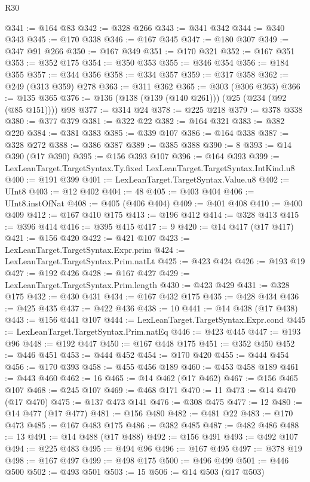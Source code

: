 \begin{lexlean}{R30}
\begin{coremodule}
@341 := @164 @83
@342 := @328 @266
@343 := @341 @342
@344 := @340 @343
@345 := @170 @338
@346 := @167 @345
@347 := @180 @307
@349 := @347 @91 @266
@350 := @167 @349
@351 := @170 @321
@352 := @167 @351
@353 := @352 @175
@354 := @350 @353
@355 := @346 @354
@356 := @184 @355
@357 := @344 @356
@358 := @334 @357
@359 := @317 @358
@362 := @249 (@313 @359) @278
@363 := @311 @362
@365 := @303 (@306 @363)
@366 := @135 @365
@376 := @136 (@138 (@139 (@140 @261))) (@25 (@234 (@92 (@85 @151)))) @98
@377 := @314 @24
@378 := @225 @218
@379 := @378 @338
@380 := @377 @379
@381 := @322 @22
@382 := @164 @321
@383 := @382 @220
@384 := @381 @383
@385 := @339 @107
@386 := @164 @338
@387 := @328 @272
@388 := @386 @387
@389 := @385 @388
@390 := 8
@393 := @14 @390 (@17 @390)
@395 := @156 @393 @107
@396 := @164 @393
@399 := LexLeanTarget.TargetSyntax.Ty.fixed LexLeanTarget.TargetSyntax.IntKind.u8
@400 := @191 @399
@401 := LexLeanTarget.TargetSyntax.Value.u8
@402 := UInt8
@403 := @12 @402
@404 := 48
@405 := @403 @404
@406 := UInt8.instOfNat
@408 := @405 (@406 @404)
@409 := @401 @408
@410 := @400 @409
@412 := @167 @410 @175
@413 := @196 @412
@414 := @328 @413
@415 := @396 @414
@416 := @395 @415
@417 := 9
@420 := @14 @417 (@17 @417)
@421 := @156 @420
@422 := @421 @107
@423 := LexLeanTarget.TargetSyntax.Expr.prim
@424 := LexLeanTarget.TargetSyntax.Prim.natLt
@425 := @423 @424
@426 := @193 @19
@427 := @192 @426
@428 := @167 @427
@429 := LexLeanTarget.TargetSyntax.Prim.length
@430 := @423 @429
@431 := @328 @175
@432 := @430 @431
@434 := @167 @432 @175
@435 := @428 @434
@436 := @425 @435
@437 := @422 @436
@438 := 10
@441 := @14 @438 (@17 @438)
@443 := @156 @441 @107
@444 := LexLeanTarget.TargetSyntax.Expr.cond
@445 := LexLeanTarget.TargetSyntax.Prim.natEq
@446 := @423 @445
@447 := @193 @96
@448 := @192 @447
@450 := @167 @448 @175
@451 := @352 @450
@452 := @446 @451
@453 := @444 @452
@454 := @170 @420
@455 := @444 @454
@456 := @170 @393
@458 := @455 @456 @189
@460 := @453 @458 @189
@461 := @443 @460
@462 := 16
@465 := @14 @462 (@17 @462)
@467 := @156 @465 @107
@468 := @245 @107
@469 := @468 @171
@470 := 11
@473 := @14 @470 (@17 @470)
@475 := @137 @473 @141
@476 := @308 @475
@477 := 12
@480 := @14 @477 (@17 @477)
@481 := @156 @480
@482 := @481 @22
@483 := @170 @473
@485 := @167 @483 @175
@486 := @382 @485
@487 := @482 @486
@488 := 13
@491 := @14 @488 (@17 @488)
@492 := @156 @491
@493 := @492 @107
@494 := @225 @483
@495 := @494 @96
@496 := @167 @495
@497 := @378 @19
@498 := @167 @497
@499 := @498 @175
@500 := @496 @499
@501 := @446 @500
@502 := @493 @501
@503 := 15
@506 := @14 @503 (@17 @503)

\end{coremodule}
\end{lexlean}
